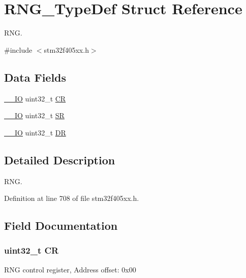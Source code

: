 \hypertarget{struct_r_n_g___type_def}{}\section{R\+N\+G\+\_\+\+Type\+Def Struct Reference}
\label{struct_r_n_g___type_def}


R\+NG.  




{\ttfamily \#include $<$stm32f405xx.\+h$>$}

\subsection*{Data Fields}
\begin{DoxyCompactItemize}
\item 
\hyperlink{core__sc300_8h_aec43007d9998a0a0e01faede4133d6be}{\+\_\+\+\_\+\+IO} uint32\+\_\+t \hyperlink{struct_r_n_g___type_def_ab40c89c59391aaa9d9a8ec011dd0907a}{CR}
\item 
\hyperlink{core__sc300_8h_aec43007d9998a0a0e01faede4133d6be}{\+\_\+\+\_\+\+IO} uint32\+\_\+t \hyperlink{struct_r_n_g___type_def_af6aca2bbd40c0fb6df7c3aebe224a360}{SR}
\item 
\hyperlink{core__sc300_8h_aec43007d9998a0a0e01faede4133d6be}{\+\_\+\+\_\+\+IO} uint32\+\_\+t \hyperlink{struct_r_n_g___type_def_a3df0d8dfcd1ec958659ffe21eb64fa94}{DR}
\end{DoxyCompactItemize}


\subsection{Detailed Description}
R\+NG. 

Definition at line 708 of file stm32f405xx.\+h.



\subsection{Field Documentation}
\subsubsection[{\texorpdfstring{CR}{CR}}]{ uint32\+\_\+t CR}\hypertarget{struct_r_n_g___type_def_ab40c89c59391aaa9d9a8ec011dd0907a}{}\label{struct_r_n_g___type_def_ab40c89c59391aaa9d9a8ec011dd0907a}
R\+NG control register, Address offset\+: 0x00 

